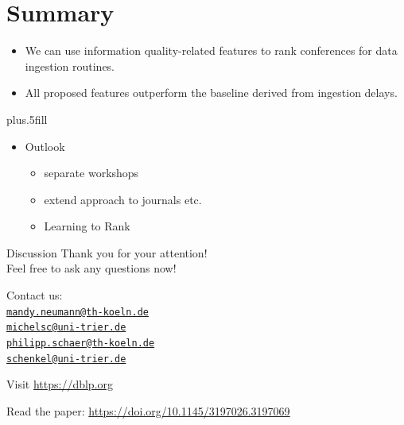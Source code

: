 \documentclass[xcolor={svgnames}]{beamer}
\makeatletter
\newcommand*{\currentname}{\@currentlabelname}
\makeatother
\begin{document}
\section*{Summary}
\begin{frame}{\currentname}\linespread{1.5}

  \begin{itemize}
    \item
      We can use information quality-related features to rank conferences for data ingestion routines.
    \item
    All proposed features outperform the baseline derived from ingestion delays.
  \end{itemize}

  \vskip0pt plus.5fill
  \begin{itemize}
  \item
    Outlook
    \begin{itemize}
    \item separate workshops
    \item extend approach to journals etc.
    \item Learning to Rank
    \end{itemize}
  \end{itemize}
\end{frame}


\begin{frame}{Discussion}
Thank you for your attention!\\
Feel free to ask any questions now!\bigskip

Contact us:\\
\href{mailto:mandy.neumann@th-koeln.de}{\nolinkurl{mandy.neumann@th-koeln.de}}\\
\href{mailto:michelsc@uni-trier.de}{\nolinkurl{michelsc@uni-trier.de}}\\
\href{mailto:philipp.schaer@th-koeln.de}{\nolinkurl{philipp.schaer@th-koeln.de}}\\
\href{mailto:schenkel@uni-trier.de}{\nolinkurl{schenkel@uni-trier.de}}\bigskip

Visit \url{https://dblp.org}

Read the paper: \url{https://doi.org/10.1145/3197026.3197069}

\end{frame}
\end{document}
